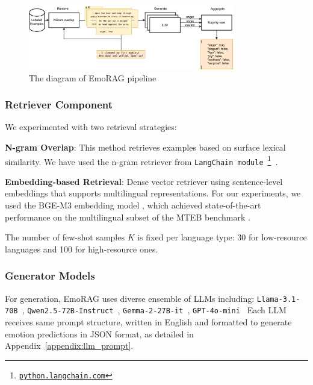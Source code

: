 \documentclass[a4paper,12pt]{extarticle}
\begin{document}
\begin{figure}[h]
    \centering
    \includegraphics[width=0.8\textwidth]{emorag.png}
    \caption{The diagram of EmoRAG pipeline}
    \label{fig:emorag_pipeline}
\end{figure}

\subsubsection{Retriever Component}

We experimented with two retrieval strategies:


\textbf{N-gram Overlap}: This method retrieves examples based on surface lexical similarity. We have used the n-gram retriever from 
\texttt{LangChain module}~\footnote{\href{https://python.langchain.com/docs/how_to/example_selectors_ngram}{\texttt{python.langchain.com}}}~\cite{Chase_LangChain_2022}. 


\textbf{Embedding-based Retrieval}: Dense vector retriever using sentence-level embeddings that supports multilingual representations. For our experiments, we used the BGE-M3 embedding model \cite{chen2024bgem3embeddingmultilingualmultifunctionality}, which achieved state-of-the-art performance on the multilingual subset of the MTEB benchmark \cite{muennighoff2023mtebmassivetextembedding}.

The number of few-shot samples $K$ is fixed per language type: 30 for low-resource languages and 100 for high-resource ones.

\subsubsection{Generator Models}

For generation, EmoRAG uses diverse ensemble of LLMs including:
\texttt{Llama-3.1-70B \cite{grattafiori2024llama3herdmodels}}, \texttt{Qwen2.5-72B-Instruct \cite{yang2024qwen2technicalreport}}, \texttt{Gemma-2-27B-it \cite{gemmateam2024gemma2improvingopen}}, \texttt{GPT-4o-mini \cite{openai2024gpt4omini}}
Each LLM receives same prompt structure, written in English and formatted to generate emotion predictions in JSON format, as detailed in Appendix~\ref{appendix:llm_prompt}.
\end{document}
